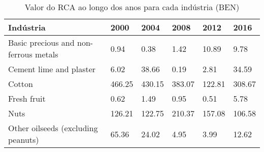 \begin{table}
\centering
\caption{Valor do RCA ao longo dos anos para cada indústria (BEN)}
\begin{tabular}{p{6cm}p{1.5cm}p{1.5cm}p{1.5cm}p{1.5cm}p{1.5cm}}
\toprule
                            Indústria &   2000 &   2004 &   2008 &   2012 &   2016 \\
\midrule
Basic precious and non-ferrous metals &   0.94 &   0.38 &   1.42 &  10.89 &   9.78 \\
              Cement lime and plaster &   6.02 &  38.66 &   0.19 &   2.81 &  34.59 \\
                               Cotton & 466.25 & 430.15 & 383.07 & 122.81 & 308.67 \\
                          Fresh fruit &   0.62 &   1.49 &   0.95 &   0.51 &   5.78 \\
                                 Nuts & 126.21 & 122.75 & 210.37 & 157.08 & 106.58 \\
   Other oilseeds (excluding peanuts) &  65.36 &  24.02 &   4.95 &   3.99 &  12.62 \\
\bottomrule
\end{tabular}
\end{table}
